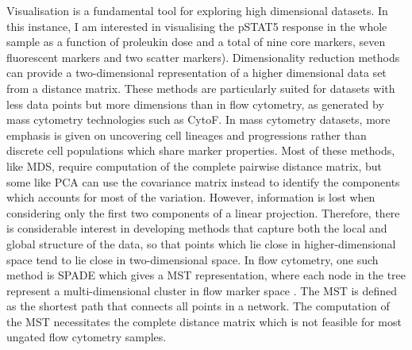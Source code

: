 Visualisation is a fundamental tool for exploring high dimensional datasets.
In this instance, I am interested in visualising the pSTAT5 response in the whole sample as a function of proleukin dose and a total of nine core markers, seven fluorescent markers and two scatter markers).
Dimensionality reduction methods can provide a two-dimensional representation of a higher dimensional data set from a distance matrix.
These methods are particularly suited for datasets with less data points but more dimensions than in flow cytometry,
as generated by mass cytometry technologies such as CytoF.
In mass cytometry datasets, more emphasis is given on uncovering cell lineages and progressions rather than discrete cell populations which share marker
properties.
Most of these methods, like \gls{MDS}, require computation of the complete pairwise distance matrix,
but some like \gls{PCA} can use the covariance matrix instead to identify the components which accounts for most of the variation. 
However, information is lost when considering only the first two components of a linear projection.
Therefore, there is considerable interest in developing methods that capture both the local and global structure of the data,
so that points which lie close in higher-dimensional space tend to lie close in two-dimensional space.
In flow cytometry, one such method is \acrfull{SPADE} which gives a \acrfull{MST} representation,
where each node in the tree represent a multi-dimensional cluster in flow marker space \citep{Simonds:2011jh}.
The \gls{MST} is defined as the shortest path that connects all points in a network.
The computation of the \gls{MST} necessitates the complete distance matrix which is not feasible for most ungated flow cytometry samples.
